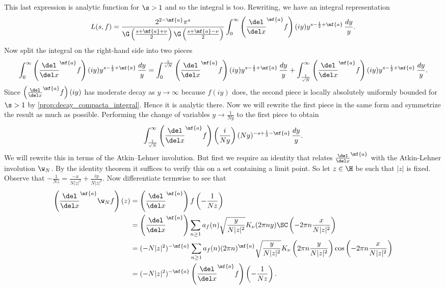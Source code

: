       This last expression is analytic function for $\s > 1$ and so the integral is too. Rewriting, we have an integral representation
      \begin{equation}\label{equ:integral_representation_Maass_1}
        L(s,f) = \frac{2^{2-\mf{a}}\pi^{s}}{\G\left(\frac{s+\mf{a}+\nu}{2}\right)\G\left(\frac{s+\mf{a}-\nu}{2}\right)}\int_{0}^{\infty}\left(\frac{\del}{\del x}^{\mf{a}}f\right)(iy)y^{s-\frac{1}{2}+\mf{a}}\,\frac{dy}{y}.
      \end{equation}
      Now split the integral on the right-hand side into two pieces
      \begin{equation}\label{equ:symmetric_integral_Maass_split}
        \int_{0}^{\infty}\left(\frac{\del}{\del x}^{\mf{a}}f\right)(iy)y^{s-\frac{1}{2}+\mf{a}}\,\frac{dy}{y} = \int_{0}^{\frac{1}{\sqrt{N}}}\left(\frac{\del}{\del x}^{\mf{a}}f\right)(iy)y^{s-\frac{1}{2}+\mf{a}}\,\frac{dy}{y}+\int_{\frac{1}{\sqrt{N}}}^{\infty}\left(\frac{\del}{\del x}^{\mf{a}}f\right)(iy)y^{s-\frac{1}{2}+\mf{a}}\,\frac{dy}{y}.
      \end{equation}
      Since $\left(\frac{\del}{\del x}^{\mf{a}}f\right)(iy)$ has moderate decay as $y \to \infty$ because $f(iy)$ does, the second piece is locally absolutely uniformly bounded for $\s > 1$ by \cref{prop:decay_compacta_integral}. Hence it is analytic there. Now we will rewrite the first piece in the same form and symmetrize the result as much as possible. Performing the change of variables $y \to \frac{1}{Ny}$ to the first piece to obtain
      \[
        \int_{\frac{1}{\sqrt{N}}}^{\infty}\left(\frac{\del}{\del x}^{\mf{a}}f\right)\left(\frac{i}{Ny}\right)(Ny)^{-s+\frac{1}{2}-\mf{a}}\,\frac{dy}{y}.
      \]
      We will rewrite this in terms of the Atkin–Lehner involution. But first we require an identity that relates $\frac{\del}{\del x}^{\mf{a}}$ with the Atkin-Lehner involution $\w_{N}$. By the identity theorem it suffices to verify this on a set containing a limit point. So let $z \in \H$ be such that $|z|$ is fixed. Observe that $-\frac{1}{Nz} = \frac{-x}{N|z|^{2}}+\frac{iy}{N|z|^{2}}$. Now differentiate termwise to see that
      \begin{align*}
        \left(\frac{\del}{\del x}^{\mf{a}}\w_{N}f\right)(z) &= \left(\frac{\del}{\del x}^{\mf{a}}\right)f\left(-\frac{1}{Nz}\right) \\
         &= \left(\frac{\del}{\del x}^{\mf{a}}\right)\sum_{n \ge 1}a_{f}(n)\sqrt{\frac{y}{N|z|^{2}}}K_{\nu}(2\pi ny)\SC\left(-2\pi n\frac{x}{N|z|^{2}}\right) \\
        &= (-N|z|^{2})^{-\mf{a}}\sum_{n \ge 1}a_{f}(n)(2\pi n)^{\mf{a}}\sqrt{\frac{y}{N|z|^{2}}}K_{\nu}\left(2\pi n\frac{y}{N|z|^{2}}\right)\cos\left(-2\pi n\frac{x}{N|z|^{2}}\right) \\
        &= (-N|z|^{2})^{-\mf{a}}\left(\frac{\del}{\del x}^{\mf{a}}f\right)\left(-\frac{1}{Nz}\right).
      \end{align*}
